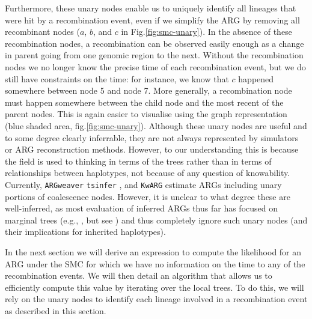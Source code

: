 \documentclass{article}
\newcommand{\tsinfer}[0]{\texttt{tsinfer}}
\newcommand{\kwarg}[0]{\texttt{KwARG}}
\newcommand{\argweaver}[0]{\texttt{ARGweaver}}
\begin{document}
Furthermore, these unary nodes enable
us to uniquely identify all lineages that were hit by a recombination event,
even if we simplify the ARG by removing all recombinant nodes
($a$, $b$, and $c$ in Fig.\ref{fig:smc-unary}).
In the absence of these recombination nodes, a recombination can be observed
easily enough as a change in parent going from one genomic region to the next.
Without the recombination nodes we no longer know the precise time of each recombination event,
but we do still have constraints on the time:
for instance, we know that $c$ happened somewhere between node 5 and node 7.
More generally, a recombination node must happen somewhere between the child node
and the most recent of the parent nodes.
This is again easier to visualise using the
graph representation (blue shaded area, fig.\ref{fig:smc-unary}).
Although these unary nodes are useful and to some degree clearly inferrable,
they are not always represented by simulators or ARG reconstruction methods.
However, to our understanding this is because
the field is used to thinking in terms of the trees
rather than in terms of relationships between haplotypes,
not because of any question of knowability.
Currently,
\argweaver{} \citep{rasmussen_genome-wide_2014}
\tsinfer{} \citep{kelleher_inferring_2019}, and
\kwarg{} \citep{ignatieva_kwarg_2021}
estimate ARGs including unary portions of coalescence nodes.
However, it is unclear to what degree these are well-inferred,
as most evaluation of inferred ARGs thus far has focused on marginal trees
(e.g., \citet{brandt2022evaluation,kelleher_inferring_2019},
but see \citet{deng2021distribution})
and thus completely ignore such unary nodes
(and their implications for inherited haplotypes).

In the next section we will derive an expression to compute the
likelihood for an ARG under the SMC for which we have no information on the
time to any of the recombination events. We will then detail an algorithm
that allows us to efficiently compute this value by iterating over the local trees.
To do this, we will rely on the unary nodes
to identify each lineage involved in a recombination event
as described in this section.
\end{document}
